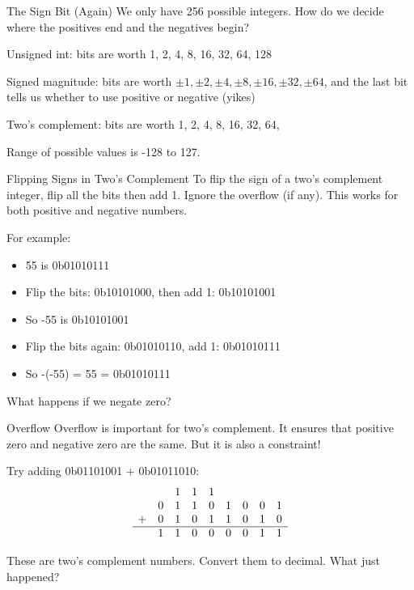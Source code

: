 \begin{frame}{The Sign Bit (Again)}
    We only have 256 possible integers. How do we decide where the positives end and the negatives begin?

    Unsigned int: bits are worth 1, 2, 4, 8, 16, 32, 64, 128

    Signed magnitude: bits are worth $\pm1, \pm2, \pm4, \pm8, \pm16, \pm32, \pm64$,
    and the last bit tells us whether to use positive or negative (yikes)

    Two's complement: bits are worth 1, 2, 4, 8, 16, 32, 64, 

    Range of possible values is -128 to 127.
\end{frame}

\begin{frame}{Flipping Signs in Two's Complement}
    To flip the sign of a two's complement integer, flip all the bits then add 1. Ignore the overflow (if any). This works for both positive and negative numbers.

    For example:
    \begin{itemize}
        \item 55 is 0b01010111
        \item Flip the bits: 0b10101000, then add 1: 0b10101001
        \item So -55 is 0b10101001
        \item Flip the bits again: 0b01010110, add 1: 0b01010111
        \item So -(-55) = 55 = 0b01010111
    \end{itemize}

    What happens if we negate zero?
\end{frame}

\begin{frame}{Overflow}
    Overflow is important for two's complement. It ensures that positive zero and negative zero are the same. But it is also a constraint!

    Try adding 0b01101001 + 0b01011010:
    \[
        \begin{array}{ccccccccc}
              &   & 1 & 1 & 1 &   &   &   &   \\
              & 0 & 1 & 1 & 0 & 1 & 0 & 0 & 1 \\
            + & 0 & 1 & 0 & 1 & 1 & 0 & 1 & 0 \\
            \hline
              & 1 & 1 & 0 & 0 & 0 & 0 & 1 & 1 \\
        \end{array}
    \]

    These are two's complement numbers. Convert them to decimal. What just
    happened?

\end{frame}

